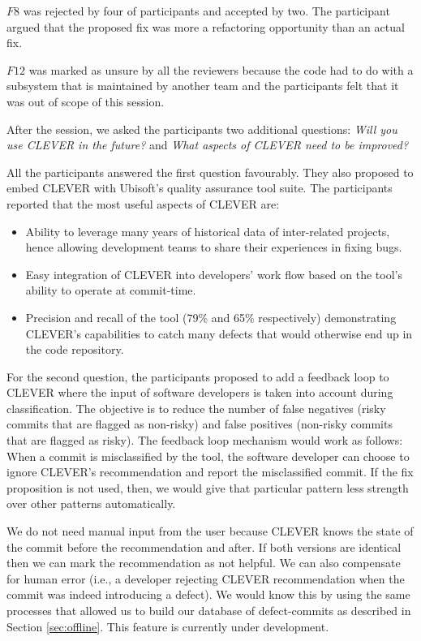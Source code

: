 \documentclass[sigconf]{acmart}
\providecommand{\tightlist}{%
  \setlength{\itemsep}{0pt}\setlength{\parskip}{0pt}}
\begin{document}
\(F8\) was rejected by four of participants and accepted by two. The
participant argued that the proposed fix was more a refactoring
opportunity than an actual fix.

\(F12\) was marked as unsure by all the reviewers because the code had
to do with a subsystem that is maintained by another team and the
participants felt that it was out of scope of this session.

After the session, we asked the participants two additional questions:
\emph{Will you use CLEVER in the future?} and \emph{What aspects of
CLEVER need to be improved?}

All the participants answered the first question favourably. They also
proposed to embed CLEVER with Ubisoft's quality assurance tool suite.
The participants reported that the most useful aspects of CLEVER are:

\begin{itemize}
\tightlist
\item
  Ability to leverage many years of historical data of inter-related
  projects, hence allowing development teams to share their experiences
  in fixing bugs.
\item
  Easy integration of CLEVER into developers' work flow based on the
  tool's ability to operate at commit-time.
\item
  Precision and recall of the tool (79\% and 65\% respectively)
  demonstrating CLEVER's capabilities to catch many defects that would
  otherwise end up in the code repository.
\end{itemize}

For the second question, the participants proposed to add a feedback
loop to CLEVER where the input of software developers is taken into
account during classification. The objective is to reduce the number of
false negatives (risky commits that are flagged as non-risky) and false
positives (non-risky commits that are flagged as risky). The feedback
loop mechanism would work as follows: When a commit is misclassified by
the tool, the software developer can choose to ignore CLEVER's
recommendation and report the misclassified commit. If the fix
proposition is not used, then, we would give that particular pattern
less strength over other patterns automatically. 

We do not need manual input from the user because CLEVER knows the state of the commit before the recommendation
and after. If both versions are
identical then we can mark the recommendation as not helpful. We can also
compensate for human error (i.e., a developer rejecting CLEVER recommendation when the commit was indeed introducing
a defect). We would know this by using the same processes that
allowed us to build our database of defect-commits as described in
Section \ref{sec:offline}. This feature is currently under development.
 
\end{document}
